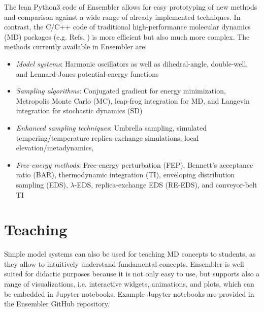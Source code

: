 The lean Python3 code\cite{VanRossum2009} of Ensembler allows for easy prototyping of new methods and comparison against a wide range of already implemented techniques. 
In contrast, the C/C++\cite{Stroustrup1995} code of traditional high-performance molecular dynamics (MD) packages (e.g. Refs. \cite{Berendsen1995,Lindahl2001a,VanDerSpoel2005,Eastman2017,Brooks2009}) is more efficient but also much more complex. 
%
The methods currently available in Ensembler are:
\begin{itemize}
	\item \textit{Model systems}: Harmonic oscillators as well as dihedral-angle, double-well, and Lennard-Jones potential-energy functions\cite{Jones1924}
	\item \textit{Sampling algorithms}: Conjugated gradient\cite{Hestenes1952} for energy minimization, Metropolis Monte Carlo (MC),\cite{Hastings1970} leap-frog integration\cite{VanGunsteren1988} for MD, and Langevin integration\cite{Brunger1984} for stochastic dynamics (SD)
	\item \textit{Enhanced sampling techniques}: Umbrella sampling,\cite{Valleau1977} simulated tempering/temperature replica-exchange simulations,\cite{Sugita1999} local elevation/metadynamics,\cite{Huber1994, Laio2002}
	\item \textit{Free-energy methods}: Free-energy perturbation (FEP),\cite{Zwanzig1954} Bennett's acceptance ratio (BAR),\cite{Bennett1976} thermodynamic integration (TI),\cite{Kirkwood1935} enveloping distribution sampling (EDS),\cite{Christ2007, Christ2008, Christ2009} $\lambda$-EDS,\cite{Koenig2020} replica-exchange EDS (RE-EDS),\cite{Sidler2016} and conveyor-belt TI\cite{Hahn2019}
\end{itemize}

\section{Teaching}

Simple model systems can also be used for teaching MD concepts to students, as they allow to intuitively understand fundamental concepts. \cite{Pohorille2010} 
Ensembler is well suited for didactic purposes because it is not only easy to use, but supports also a range of visualizations, i.e. interactive widgets, animations, and plots, which can be embedded in Jupyter notebooks.\cite{Kluyver2016}
Example Jupyter notebooks\cite{Kluyver2016} are provided in the Ensembler GitHub repository.
